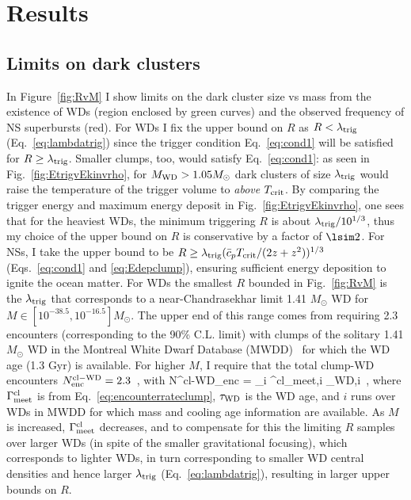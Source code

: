 \documentclass[
    twocolumn,
	prd,
        amssymb,
	preprintnumbers,
	secnumarabic,
	nofootinbib,
	superscriptaddress]{revtex4-1}
\begin{document}
\section{Results}
\label{sec:results}

\subsection{Limits on dark clusters}
\label{subsec:limitsclumps}

In Figure~\ref{fig:RvM} I show limits on the dark cluster size vs mass from the existence of WDs (region enclosed by green curves) and the observed frequency of NS superbursts (red).
For WDs I fix the upper bound on $R$ as $R < \lambda_{\rm trig}$ (Eq.~\eqref{eq:lambdatrig}) since the trigger condition Eq.~\eqref{eq:cond1} will be satisfied for $R \geq \lambda_{\rm trig}$.
Smaller clumps, too, would satisfy Eq.~\eqref{eq:cond1}: as seen in Fig.~\ref{fig:EtrigvEkinvrho}, for $M_{\rm WD} > 1.05 M_\odot$ dark clusters of size $\lambda_{\rm trig}$ would raise the temperature of the trigger volume to {\em above} $T_{\rm crit}$.
By comparing the trigger energy and maximum energy deposit in Fig.~\ref{fig:EtrigvEkinvrho}, one sees that for the heaviest WDs, the minimum triggering $R$ is about $\lambda_{\rm trig}/10^{1/3}$, thus my choice of the upper bound on $R$ is conservative by a factor of $\lsim 2$. 
For NSs, I take the upper bound to be $R \geq \lambda_{\rm trig}(\bar c_p T_{\rm crit}/(2 z + z^2))^{1/3}$ (Eqs.~\eqref{eq:cond1} and \eqref{eq:Edepclump}), ensuring sufficient energy deposition to ignite the ocean matter.
For WDs the smallest $R$ bounded in Fig.~\ref{fig:RvM} is the $\lambda_{\rm trig}$ that corresponds to a near-Chandrasekhar limit 1.41 $M_\odot$ WD for $M \in [10^{-38.5}, 10^{-16.5}] M_\odot$.
The upper end of this range comes from requiring 2.3 encounters (corresponding to the 90\% C.L. limit) with clumps of the solitary 1.41 $M_\odot$ WD in the Montreal White Dwarf Database (MWDD)~\cite{MontrealWDDatabase} for which the WD age (1.3 Gyr) is available.  
For higher $M$, I require that the total clump-WD encounters $N^{\rm cl-WD}_{\rm enc} = 2.3$~, with
\beq
N^{\rm cl-WD}_{\rm enc} = \sum_i \Gamma^{\rm cl}_{{\rm meet},i} \tau_{{\rm WD},i}~,
\label{eq:Nenc}
\eeq
where $\Gamma^{\rm cl}_{\rm meet}$ is from Eq.~\eqref{eq:encounterrateclump},
$\tau_{\rm WD}$ is the WD age, and $i$ runs over WDs in MWDD for which mass and cooling age information are available.
As $M$ is increased, $\Gamma^{\rm cl}_{\rm meet}$ decreases, and to compensate for this the limiting $R$ samples over larger WDs (in spite of the smaller gravitational focusing), which corresponds to lighter WDs, in turn corresponding to smaller WD central densities and hence larger $\lambda_{\rm trig}$ (Eq.~\eqref{eq:lambdatrig}), resulting in larger upper bounds on $R$.   
\end{document}
